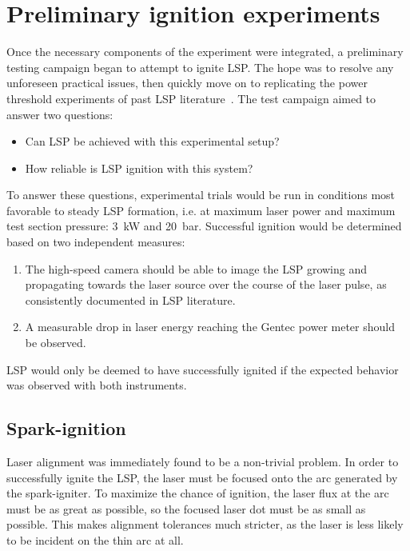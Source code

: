     \section{Preliminary ignition experiments} \label{sec:ignitiontest}
        Once the necessary components of the experiment were integrated, a preliminary testing campaign began to attempt to ignite LSP. The hope was to resolve any unforeseen practical issues, then quickly move on to replicating the power threshold experiments of past LSP literature~\cite{zimakovInteractionNearIRLaser2016,matsuiGeneratingConditionsArgon2019,luCharacteristicDiagnosticsLaserStabilized2022}. The test campaign aimed to answer two questions:
        \begin{itemize}
            \item Can LSP be achieved with this experimental setup?
            \item How reliable is LSP ignition with this system?
        \end{itemize}
        To answer these questions, experimental trials would be run in conditions most favorable to steady LSP formation, i.e. at maximum laser power and maximum test section pressure: \qty{3}{kW} and \qty{20}{bar}. Successful ignition would be determined based on two independent measures:
        \begin{enumerate}
            \item The high-speed camera should be able to image the LSP growing and propagating towards the laser source over the course of the laser pulse, as consistently documented in LSP literature.
            \item A measurable drop in laser energy reaching the Gentec power meter should be observed.
        \end{enumerate}
        LSP would only be deemed to have successfully ignited if the expected behavior was observed with both instruments.

        \subsection{Spark-ignition}
            Laser alignment was immediately found to be a non-trivial problem. In order to successfully ignite the LSP, the laser must be focused onto the arc generated by the spark-igniter. To maximize the chance of ignition, the laser flux at the arc must be as great as possible, so the focused laser dot must be as small as possible. This makes alignment tolerances much stricter, as the laser is less likely to be incident on the thin arc at all.

